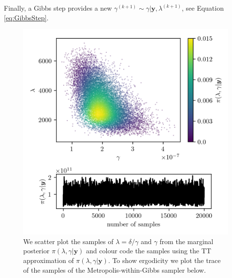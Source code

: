 Finally, a Gibbs step provides a new $\gamma^{(k+1)} \sim \gamma | \bm{y}, \lambda^{(k+1)}$, see Equation \eqref{eq:GibbsStep}.
\begin{figure}[ht!]
	\centering
	\includegraphics{ScatterplusHistoPlusTT.png}
	\caption[Scatter plot of samples from marginal posterior, including weighting from TT approximation; additional trace plot of the marginal posterior samples.]{We scatter plot the samples of $\lambda = \delta / \gamma $ and $\gamma$ from the marginal posterior $\pi(\lambda , \gamma  | \bm{y})$ and colour code the samples using the TT approximation of $\pi(\lambda , \gamma  | \bm{y})$. To show ergodicity we plot the trace of the samples of the Metropolis-within-Gibbs sampler below.}
	\label{fig:ScatterPlotTT}
\end{figure}

